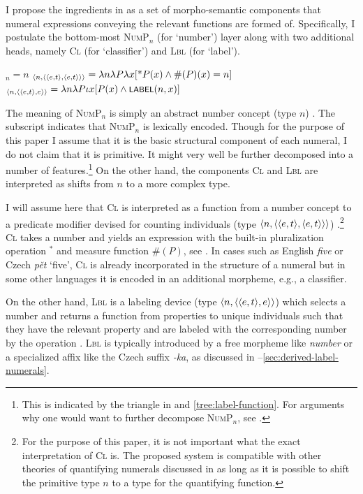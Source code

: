 \documentclass[output=paper]{langscibook}
\begin{document}
I propose the ingredients in  as a set of morpho-semantic components that numeral expressions conveying the relevant functions are formed of. Specifically, I postulate the bottom-most \textsc{NumP}$_n$ (for `number') layer along with two additional heads, namely \textsc{Cl} (for `classifier') and \textsc{Lbl} (for `label').

\ea\label{form:ingredients} \ea {}$_n = n$\label{form:nump}
\ex {}$_{\langle{n,\langle{\langle{e,t}\rangle,\langle{e,t}\rangle}\rangle}\rangle}=\lambda n\lambda P\lambda x[\text{*}P(x) \wedge \#(P)(x)=n]$\label{form:cl}
\ex {}$_{\stb{n,\stb{\stb{e,t},e}}} = \lambda n\lambda P\iota x[P(x) \wedge \cnst{label}(n,x)]$\label{form:lbl}
\z 
\z 

\noindent The meaning of \textsc{NumP}$_n$ is simply an abstract number concept (type $n$) . The subscript indicates that \textsc{NumP}$_n$ is lexically encoded. Though for the purpose of this paper I assume that it is the basic structural component of each numeral, I do not claim that it is primitive. It might very well be further decomposed into a number of features.\footnote{This is indicated by the triangle in  and \ref{tree:label-function}. For arguments why one would want to further decompose \textsc{NumP}$_n$, see \citet{wagiel_caha2020universal}.} On the other hand, the components \textsc{Cl} and \textsc{Lbl} are interpreted as shifts from $n$ to a more complex type. 

I will assume here that \textsc{Cl} is interpreted as a function from a number concept to a predicate modifier devised for counting individuals (type $\langle{n,\langle{\langle{e,t}\rangle,\langle{e,t}\rangle}\rangle}\rangle$) .\footnote{For the purpose of this paper, it is not important what the exact interpretation of \textsc{Cl} is. The proposed system is compatible with other theories of quantifying numerals discussed in  as long as it is possible to shift the primitive type $n$ to a type for the quantifying function.} \textsc{Cl} takes a number and yields an expression with the built-in pluralization operation ${}^*$ and measure function $\#(P)$, see . In cases such as English \textit{five} or Czech \textit{pět} `five', \textsc{Cl} is already incorporated in the structure of a numeral but in some other languages it is encoded in an additional morpheme, e.g., a classifier.

On the other hand, \textsc{Lbl} is a labeling device (type $\langle{n,\langle{\langle{e,t}\rangle,e}\rangle}\rangle$) which selects a number and returns a function from properties to unique individuals such that they have the relevant property and are labeled with the corresponding number by the  operation . \textsc{Lbl} is typically introduced by a free morpheme like \textit{number} or a specialized affix like the Czech suffix \textit{-ka}, as discussed in --\ref{sec:derived-label-numerals}.  
\end{document}
